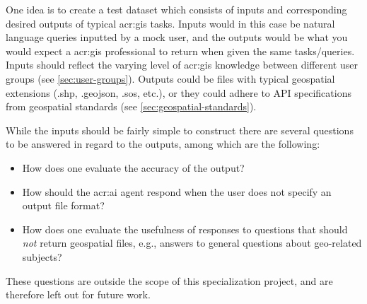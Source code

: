 One idea is to create a test dataset which consists of inputs and corresponding desired outputs of typical \acrshort{acr:gis} tasks. Inputs would in this case be natural language queries inputted by a mock user, and the outputs would be what you would expect a \acrshort{acr:gis} professional to return when given the same tasks/queries. Inputs should reflect the varying level of \acrshort{acr:gis} knowledge between different user groups (see \autoref{sec:user-groups}). Outputs could be files with typical geospatial extensions (.shp, .geojson, .sos, etc.), or they could adhere to API specifications from geospatial standards (see \autoref{sec:geospatial-standards}).

While the inputs should be fairly simple to construct there are several questions to be answered in regard to the outputs, among which are the following:

\begin{itemize}
    \item How does one evaluate the accuracy of the output?
    \item How should the \acrshort{acr:ai} agent respond when the user does not specify an output file format?
    \item How does one evaluate the usefulness of responses to questions that should \textit{not} return geospatial files, e.g., answers to general questions about geo-related subjects?
\end{itemize}

\noindent These questions are outside the scope of this specialization project, and are therefore left out for future work.



\glsaddall